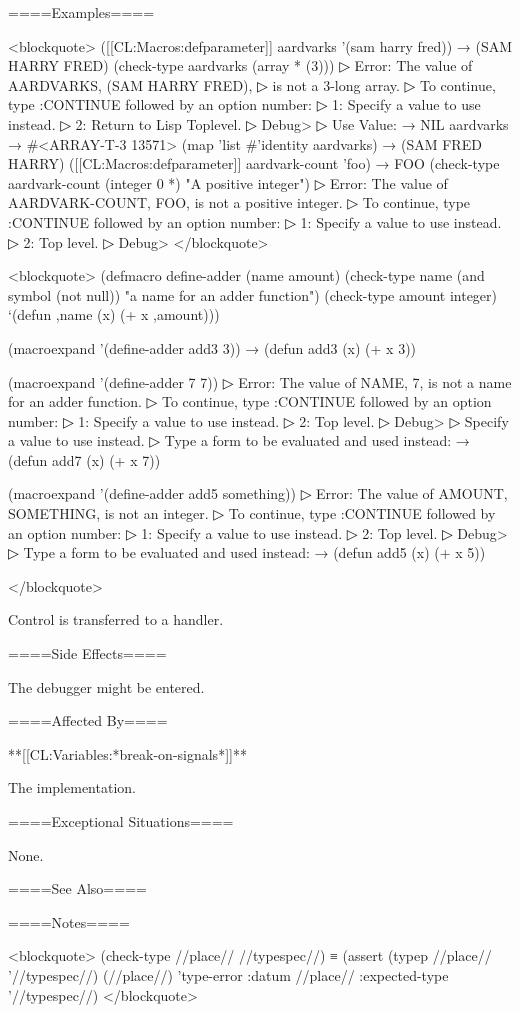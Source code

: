====Examples====

<blockquote> ([[CL:Macros:defparameter]] aardvarks '(sam harry fred)) → (SAM HARRY FRED) (check-type aardvarks (array * (3)))
▷ Error: The value of AARDVARKS, (SAM HARRY FRED),
▷ is not a 3-long array.
▷ To continue, type :CONTINUE followed by an option number:
▷ 1: Specify a value to use instead.
▷ 2: Return to Lisp Toplevel.
▷ Debug> 
▷ Use Value:  → NIL aardvarks → #<ARRAY-T-3 13571> (map 'list #'identity aardvarks) → (SAM FRED HARRY) ([[CL:Macros:defparameter]] aardvark-count 'foo) → FOO (check-type aardvark-count (integer 0 *) "A positive integer")
▷ Error: The value of AARDVARK-COUNT, FOO, is not a positive integer.
▷ To continue, type :CONTINUE followed by an option number:
▷ 1: Specify a value to use instead.
▷ 2: Top level.
▷ Debug>  </blockquote>

<blockquote> (defmacro define-adder (name amount) (check-type name (and symbol (not null)) "a name for an adder function") (check-type amount integer) `(defun ,name (x) (+ x ,amount)))

(macroexpand '(define-adder add3 3)) → (defun add3 (x) (+ x 3))

(macroexpand '(define-adder 7 7))
▷ Error: The value of NAME, 7, is not a name for an adder function.
▷ To continue, type :CONTINUE followed by an option number:
▷ 1: Specify a value to use instead.
▷ 2: Top level.
▷ Debug> 
▷ Specify a value to use instead.
▷ Type a form to be evaluated and used instead:  → (defun add7 (x) (+ x 7))

(macroexpand '(define-adder add5 something))
▷ Error: The value of AMOUNT, SOMETHING, is not an integer.
▷ To continue, type :CONTINUE followed by an option number:
▷ 1: Specify a value to use instead.
▷ 2: Top level.
▷ Debug> 
▷ Type a form to be evaluated and used instead:  → (defun add5 (x) (+ x 5))

</blockquote>

Control is transferred to a handler.

====Side Effects====

The debugger might be entered.

====Affected By====

**[[CL:Variables:*break-on-signals*]]**

The implementation.

====Exceptional Situations====

None.

====See Also====

{\secref\ConditionSystemConcepts}

====Notes====

<blockquote> (check-type //place// //typespec//) ≡ (assert (typep //place// '//typespec//) (//place//) 'type-error :datum //place// :expected-type '//typespec//) </blockquote>


